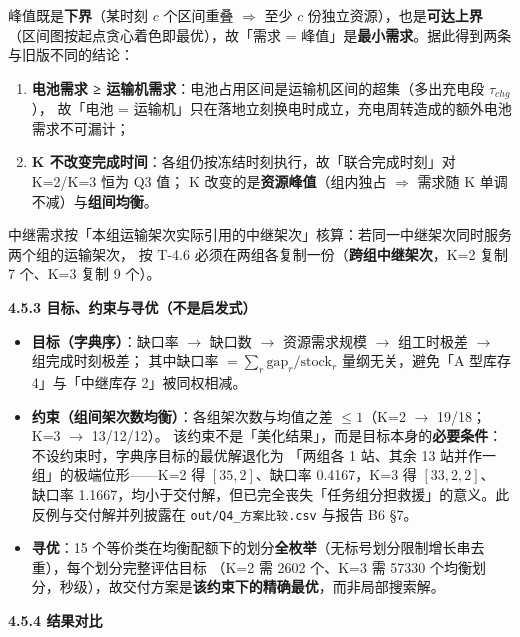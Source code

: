 \documentclass[
  10.5pt,
]{article}
\providecommand{\tightlist}{%
  \setlength{\itemsep}{0pt}\setlength{\parskip}{0pt}}
\begin{document}
峰值既是\textbf{下界}（某时刻 \(c\) 个区间重叠 \(\Rightarrow\) 至少
\(c\) 份独立资源），也是\textbf{可达上界}
（区间图按起点贪心着色即最优），故「需求 =
峰值」是\textbf{最小需求}。据此得到两条与旧版不同的结论：

\begin{enumerate}
\def\labelenumi{\arabic{enumi}.}
\tightlist
\item
  \textbf{电池需求 ≥
  运输机需求}：电池占用区间是运输机区间的超集（多出充电段
  \(\tau_{chg}\)）， 故「电池 =
  运输机」只在落地立刻换电时成立，充电周转造成的额外电池需求不可漏计；
\item
  \textbf{K 不改变完成时间}：各组仍按冻结时刻执行，故「联合完成时刻」对
  K=2/K=3 恒为 Q3 值； K 改变的是\textbf{资源峰值}（组内独占
  \(\Rightarrow\) 需求随 K 单调不减）与\textbf{组间均衡}。
\end{enumerate}

中继需求按「本组运输架次实际引用的中继架次」核算：若同一中继架次同时服务两个组的运输架次，
按 T-4.6 必须在两组各复制一份（\textbf{跨组中继架次}，K=2 复制 7 个、K=3
复制 9 个）。

\textbf{4.5.3 目标、约束与寻优（不是启发式）}

\begin{itemize}
\tightlist
\item
  \textbf{目标（字典序）}：缺口率 \(\to\) 缺口数 \(\to\) 资源需求规模
  \(\to\) 组工时极差 \(\to\) 组完成时刻极差； 其中缺口率
  \(=\sum_r \text{gap}_r/\text{stock}_r\) 量纲无关，避免「A 型库存
  4」与「中继库存 2」被同权相减。
\item
  \textbf{约束（组间架次数均衡）}：各组架次数与均值之差 \(\le 1\)（K=2
  \(\to\) 19/18；K=3 \(\to\) 13/12/12）。
  该约束不是「美化结果」，而是目标本身的\textbf{必要条件}：不设约束时，字典序目标的最优解退化为
  「两组各 1 站、其余 13 站并作一组」的极端位形------K=2 得
  \([35,2]\)、缺口率 0.4167，K=3 得 \([33,2,2]\)、 缺口率
  1.1667，均小于交付解，但已完全丧失「任务组分担救援」的意义。此反例与交付解并列披露在
  \texttt{out/Q4\_方案比较.csv} 与报告 B6 §7。
\item
  \textbf{寻优}：15
  个等价类在均衡配额下的划分\textbf{全枚举}（无标号划分限制增长串去重），每个划分完整评估目标
  （K=2 需 2602 个、K=3 需 57330
  个均衡划分，秒级），故交付方案是\textbf{该约束下的精确最优}，而非局部搜索解。
\end{itemize}

\textbf{4.5.4 结果对比}
\end{document}
